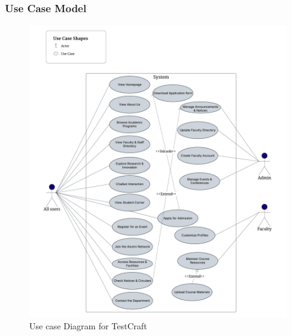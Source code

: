 \documentclass[11pt]{article}
\begin{document}
\subsubsection{Use Case Model}
\begin{figure}[H]
    \centering
    \includegraphics[width=\textwidth]{Usecase Diagram.png}
    \caption{Use case Diagram for TestCraft}
\end{figure}
\FloatBarrier
\newpage
\end{document}
